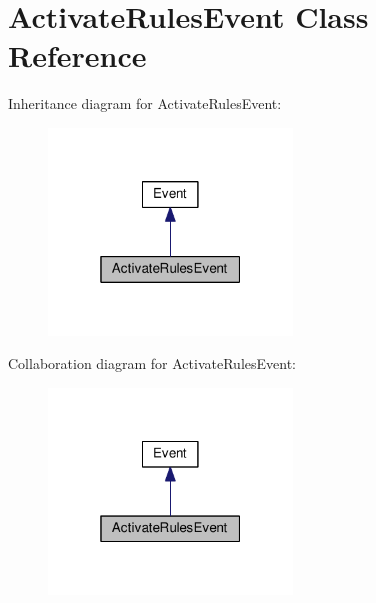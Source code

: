 \hypertarget{classActivateRulesEvent}{}\section{Activate\+Rules\+Event Class Reference}
\label{classActivateRulesEvent}


Inheritance diagram for Activate\+Rules\+Event\+:
\nopagebreak
\begin{figure}[H]
\begin{center}
\leavevmode
\includegraphics[width=184pt]{classActivateRulesEvent__inherit__graph}
\end{center}
\end{figure}


Collaboration diagram for Activate\+Rules\+Event\+:
\nopagebreak
\begin{figure}[H]
\begin{center}
\leavevmode
\includegraphics[width=184pt]{classActivateRulesEvent__coll__graph}
\end{center}
\end{figure}
